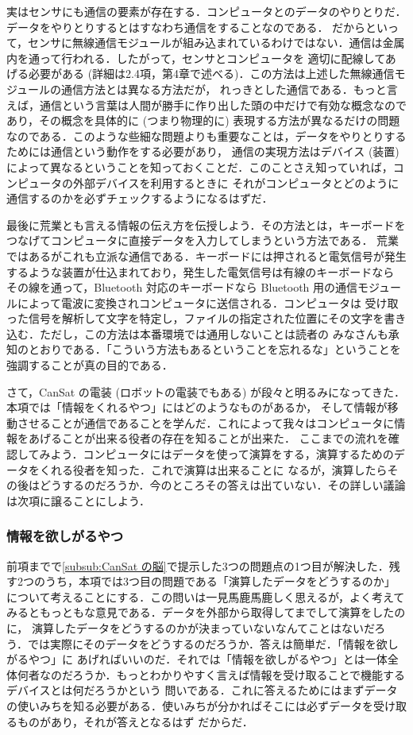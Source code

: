 \documentclass[dvipdfmx]{jsarticle}
\begin{document}
実はセンサにも通信の要素が存在する．コンピュータとのデータのやりとりだ．データをやりとりするとはすなわち通信をすることなのである．
だからといって，センサに無線通信モジュールが組み込まれているわけではない．通信は金属内を通って行われる．したがって，センサとコンピュータを
適切に配線してあげる必要がある (詳細は2.4項，第4章で述べる)．この方法は上述した無線通信モジュールの通信方法とは異なる方法だが，
れっきとした通信である．もっと言えば，通信という言葉は人間が勝手に作り出した頭の中だけで有効な概念なのであり，その概念を具体的に (つまり物理的に)
表現する方法が異なるだけの問題なのである．このような些細な問題よりも重要なことは，データをやりとりするためには通信という動作をする必要があり，
通信の実現方法はデバイス (装置) によって異なるということを知っておくことだ．このことさえ知っていれば，コンピュータの外部デバイスを利用するときに
それがコンピュータとどのように通信するのかを必ずチェックするようになるはずだ．

最後に荒業とも言える情報の伝え方を伝授しよう．その方法とは，キーボードをつなげてコンピュータに直接データを入力してしまうという方法である．
荒業ではあるがこれも立派な通信である．キーボードには押されると電気信号が発生するような装置が仕込まれており，発生した電気信号は有線のキーボードなら
その線を通って，Bluetooth 対応のキーボードなら Bluetooth 用の通信モジュールによって電波に変換されコンピュータに送信される．コンピュータは
受け取った信号を解析して文字を特定し，ファイルの指定された位置にその文字を書き込む．ただし，この方法は本番環境では通用しないことは読者の
みなさんも承知のとおりである．「こういう方法もあるということを忘れるな」ということを強調することが真の目的である．

さて，CanSat の電装 (ロボットの電装でもある) が段々と明るみになってきた．本項では「情報をくれるやつ」にはどのようなものがあるか，
そして情報が移動させることが通信であることを学んだ．これによって我々はコンピュータに情報をあげることが出来る役者の存在を知ることが出来た．
ここまでの流れを確認してみよう．コンピュータにはデータを使って演算をする，演算するためのデータをくれる役者を知った．これで演算は出来ることに
なるが，演算したらその後はどうするのだろうか．今のところその答えは出ていない．その詳しい議論は次項に譲ることにしよう．


\subsubsection{情報を欲しがるやつ}
\label{subsub:情報を欲しがるやつ}

前項までで\ref{subsub:CanSat の脳}で提示した3つの問題点の1つ目が解決した．残す2つのうち，本項では3つ目の問題である「演算したデータをどうするのか」
について考えることにする．この問いは一見馬鹿馬鹿しく思えるが，よく考えてみるともっともな意見である．データを外部から取得してまでして演算をしたのに，
演算したデータをどうするのかが決まっていないなんてことはないだろう．では実際にそのデータをどうするのだろうか．答えは簡単だ．「情報を欲しがるやつ」に
あげればいいのだ．それでは「情報を欲しがるやつ」とは一体全体何者なのだろうか．もっとわかりやすく言えば情報を受け取ることで機能するデバイスとは何だろうかという
問いである．これに答えるためにはまずデータの使いみちを知る必要がある．使いみちが分かればそこには必ずデータを受け取るものがあり，それが答えとなるはず
だからだ．
\end{document}
